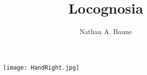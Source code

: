 \documentclass[man, natbib]{apa6}
\title{Locognosia}
\author{Nathan A. Baune}
\affiliation{University of Missouri-Columbia}
\begin{document}
\setcounter{equation}{0}
\begin{figure}
\texttt{[image: HandRight.jpg]}
\end{figure}
\end{document}
